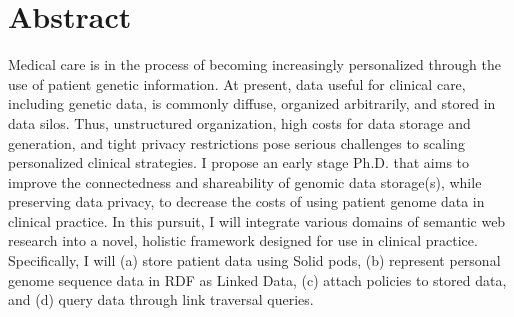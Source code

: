 
\section{Abstract}
    Medical care is in the process of becoming increasingly personalized through the use of patient genetic information. 
    At present, data useful for clinical care, including genetic data, is commonly diffuse, organized arbitrarily, and stored in data silos. 
    Thus, unstructured organization, high costs for data storage and generation, and tight privacy restrictions pose serious challenges to scaling personalized clinical strategies.
    I propose an early stage Ph.D. that aims to improve the connectedness and shareability of genomic data storage(s), while preserving data privacy, to decrease the costs of using patient genome data in clinical practice. 
    In this pursuit, I will integrate various domains of semantic web research into a novel, holistic framework designed for use in clinical practice.
    Specifically, I will (a) store patient data using Solid pods, (b) represent personal genome sequence data in RDF as Linked Data, (c) attach policies to stored data, and (d) query data through link traversal queries.



